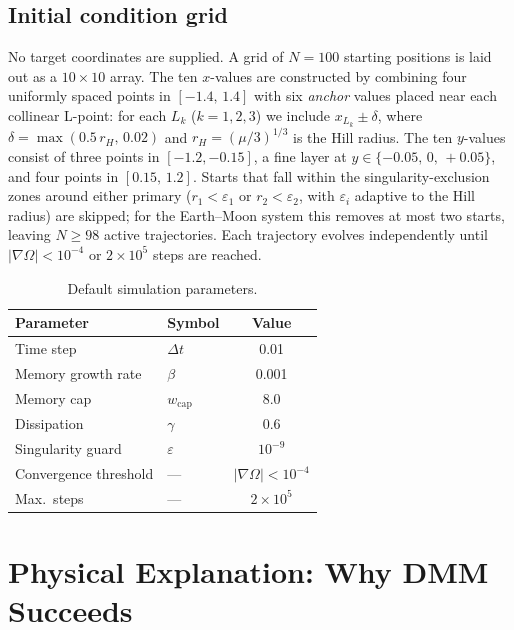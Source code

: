 \documentclass[10pt,twocolumn]{article}
\begin{document}
\subsection{Initial condition grid}

No target coordinates are supplied.
A grid of $N=100$ starting positions is laid out as a $10\times10$ array.
The ten $x$-values are constructed by combining four uniformly spaced points
in $[-1.4,\,1.4]$ with six \emph{anchor} values placed near each collinear
L-point: for each $L_k$ ($k=1,2,3$) we include $x_{L_k}\pm\delta$, where
$\delta=\max(0.5\,r_H,\,0.02)$ and $r_H=(\mu/3)^{1/3}$ is the Hill radius.
The ten $y$-values consist of three points in $[-1.2,-0.15]$, a fine layer
at $y\in\{-0.05,\,0,\,+0.05\}$, and four points in $[0.15,\,1.2]$.
Starts that fall within the singularity-exclusion zones around either primary
($r_1<\varepsilon_1$ or $r_2<\varepsilon_2$, with $\varepsilon_i$ adaptive
to the Hill radius) are skipped; for the Earth--Moon system this removes at
most two starts, leaving $N\geq98$ active trajectories.
Each trajectory evolves independently until $|\nabla\Omega|<10^{-4}$
or $2\times10^5$ steps are reached.

\begin{table}[ht]
\centering
\caption{Default simulation parameters.}
\label{tab:params}
\small
\begin{tabular}{llc}
\toprule
Parameter             & Symbol            & Value \\
\midrule
Time step             & $\Delta t$        & 0.01 \\
Memory growth rate    & $\beta$           & 0.001 \\
Memory cap            & $w_{\text{cap}}$  & 8.0 \\
Dissipation           & $\gamma$          & 0.6 \\
Singularity guard     & $\varepsilon$     & $10^{-9}$ \\
Convergence threshold & ---               & $|\nabla\Omega|<10^{-4}$ \\
Max.\ steps           & ---               & $2\times10^5$ \\
\bottomrule
\end{tabular}
\end{table}

\section{Physical Explanation: Why DMM Succeeds}
\end{document}

